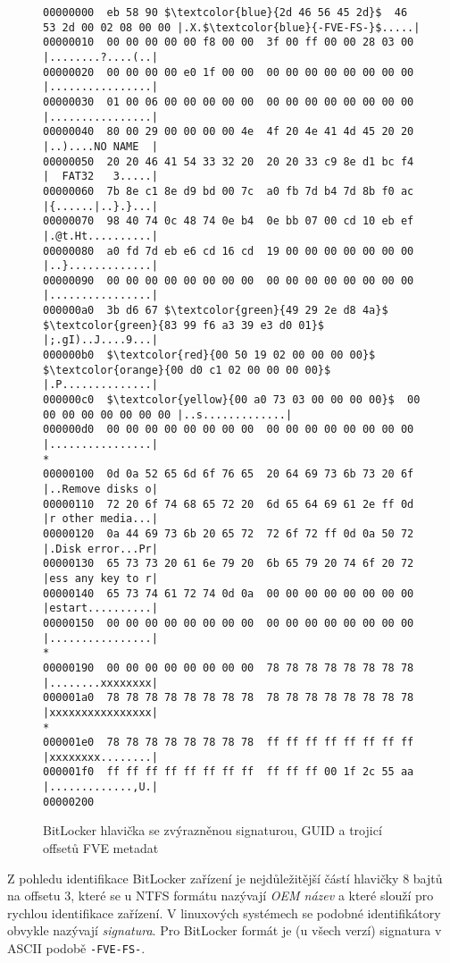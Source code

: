 \begin{figure}[h]
		\centering
		\captionsetup{width=0.65\linewidth}
\begin{lstlisting}[frame=none, escapechar=$, basicstyle=\ttfamily\small, columns=fullflexible, keepspaces=true]
00000000  eb 58 90 $\textcolor{blue}{2d 46 56 45 2d}$  46 53 2d 00 02 08 00 00 |.X.$\textcolor{blue}{-FVE-FS-}$.....|
00000010  00 00 00 00 00 f8 00 00  3f 00 ff 00 00 28 03 00 |........?....(..|
00000020  00 00 00 00 e0 1f 00 00  00 00 00 00 00 00 00 00 |................|
00000030  01 00 06 00 00 00 00 00  00 00 00 00 00 00 00 00 |................|
00000040  80 00 29 00 00 00 00 4e  4f 20 4e 41 4d 45 20 20 |..)....NO NAME  |
00000050  20 20 46 41 54 33 32 20  20 20 33 c9 8e d1 bc f4 |  FAT32   3.....|
00000060  7b 8e c1 8e d9 bd 00 7c  a0 fb 7d b4 7d 8b f0 ac |{......|..}.}...|
00000070  98 40 74 0c 48 74 0e b4  0e bb 07 00 cd 10 eb ef |.@t.Ht..........|
00000080  a0 fd 7d eb e6 cd 16 cd  19 00 00 00 00 00 00 00 |..}.............|
00000090  00 00 00 00 00 00 00 00  00 00 00 00 00 00 00 00 |................|
000000a0  3b d6 67 $\textcolor{green}{49 29 2e d8 4a}$  $\textcolor{green}{83 99 f6 a3 39 e3 d0 01}$ |;.gI)..J....9...|
000000b0  $\textcolor{red}{00 50 19 02 00 00 00 00}$  $\textcolor{orange}{00 d0 c1 02 00 00 00 00}$ |.P..............|
000000c0  $\textcolor{yellow}{00 a0 73 03 00 00 00 00}$  00 00 00 00 00 00 00 00 |..s.............|
000000d0  00 00 00 00 00 00 00 00  00 00 00 00 00 00 00 00 |................|
*
00000100  0d 0a 52 65 6d 6f 76 65  20 64 69 73 6b 73 20 6f |..Remove disks o|
00000110  72 20 6f 74 68 65 72 20  6d 65 64 69 61 2e ff 0d |r other media...|
00000120  0a 44 69 73 6b 20 65 72  72 6f 72 ff 0d 0a 50 72 |.Disk error...Pr|
00000130  65 73 73 20 61 6e 79 20  6b 65 79 20 74 6f 20 72 |ess any key to r|
00000140  65 73 74 61 72 74 0d 0a  00 00 00 00 00 00 00 00 |estart..........|
00000150  00 00 00 00 00 00 00 00  00 00 00 00 00 00 00 00 |................|
*
00000190  00 00 00 00 00 00 00 00  78 78 78 78 78 78 78 78 |........xxxxxxxx|
000001a0  78 78 78 78 78 78 78 78  78 78 78 78 78 78 78 78 |xxxxxxxxxxxxxxxx|
*
000001e0  78 78 78 78 78 78 78 78  ff ff ff ff ff ff ff ff |xxxxxxxx........|
000001f0  ff ff ff ff ff ff ff ff  ff ff ff 00 1f 2c 55 aa |.............,U.|
00000200
\end{lstlisting}
		\caption{BitLocker hlavička se zvýrazněnou signaturou, GUID a trojicí offsetů FVE metadat}
		\label{fig:bitlocker-header}
\end{figure}

Z pohledu identifikace BitLocker zařízení je nejdůležitější částí hlavičky 8 bajtů na offsetu 3, které se u NTFS formátu nazývají \emph{OEM název} a které slouží pro rychlou identifikace zařízení. V linuxových systémech se podobné identifikátory obvykle nazývají \emph{signatura}.  Pro BitLocker formát je (u všech verzí) signatura v ASCII podobě \texttt{-FVE-FS-}\cite{Caseyc2010}.

